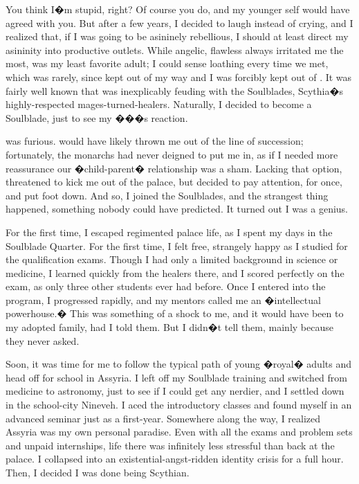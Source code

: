 \documentclass[char]{Kos}
\begin{document}
You think I�m stupid, right? Of course you do, and my younger self would have agreed with you. But after a few years, I decided to laugh instead of crying, and I realized that, if I was going to be asininely rebellious, I should at least direct my asininity into productive outlets. While angelic, flawless \cBride{\nickname} always irritated me the most, \cBride{\their} \cScythiaQueen{\parent} \cScythiaQueen{\nickname} was my least favorite adult; I could sense \cScythiaQueen{\their} loathing every time we met, which was rarely, since \cScythiaQueen{\they} kept out of my way and I was forcibly kept out of \cScythiaQueen{\theirs}. It was fairly well known that \cScythiaQueen{\they} was inexplicably feuding with the Soulblades, Scythia�s highly-respected mages-turned-healers. Naturally, I decided to become a Soulblade, just to see my �\cScythiaQueen{\parent}��s reaction.

\cScythiaQueen{\They} was furious. \cScythiaQueen{\They} would have likely thrown me out of the line of succession; fortunately, the monarchs had never deigned to put me in, as if I needed more reassurance our �child-parent� relationship was a sham. Lacking that option, \cScythiaQueen{\they} threatened to kick me out of the palace, but \cScythiaQueen{\their} \cScythiaKing{\spouse} decided to pay attention, for once, and put \cScythiaKing{\their} foot down. And so, I joined the Soulblades, and the strangest thing happened, something nobody could have predicted. It turned out I was a genius.

For the first time, I escaped regimented palace life, as I spent my days in the Soulblade Quarter. For the first time, I felt free, strangely happy as I studied for the qualification exams. Though I had only a limited background in science or medicine, I learned quickly from the healers there, and I scored perfectly on the exam, as only three other students ever had before. Once I entered into the program, I progressed rapidly, and my mentors called me an �intellectual powerhouse.� This was something of a shock to me, and it would have been to my adopted family, had I told them. But I didn�t tell them, mainly because they never asked.

Soon, it was time for me to follow the typical path of young �royal� adults and head off for school in Assyria. I left off my Soulblade training and switched from medicine to astronomy, just to see if I could get any nerdier, and I settled down in the school-city Nineveh. I aced the introductory classes and found myself in an advanced seminar just as a first-year. Somewhere along the way, I realized Assyria was my own personal paradise. Even with all the exams and problem sets and unpaid internships, life there was infinitely less stressful than back at the palace. I collapsed into an existential-angst-ridden identity crisis for a full hour. Then, I decided I was done being Scythian.
\end{document}
